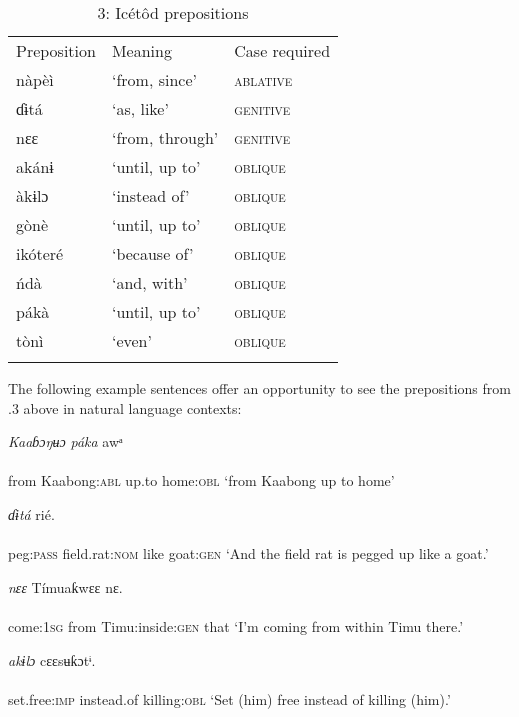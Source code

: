 \begin{table}
\caption{3: Icétôd prepositions}
\label{tab:3}


\begin{tabularx}{\textwidth}{XXX}
\lsptoprule

Preposition & Meaning & Case required\\
nàpèì & ‘from, since’ & \textsc{ablative}\\
ɗɨtá & ‘as, like’ & \textsc{genitive}\\
nɛɛ & ‘from, through’ & \textsc{genitive}\\
akánɨ & ‘until, up to’ & \textsc{oblique}\\
àkɨlɔ & ‘instead of’ & \textsc{oblique}\\
gònè & ‘until, up to’ & \textsc{oblique}\\
ikóteré & ‘because of’ & \textsc{oblique}\\
ńdà & ‘and, with’ & \textsc{oblique}\\
pákà & ‘until, up to’ & \textsc{oblique}\\
tònì & ‘even’ & \textsc{oblique}\\
\lspbottomrule
\end{tabularx}
\end{table}
The following example sentences offer an opportunity to see the prepositions from .3 above in natural language contexts:


 
\ea\label{ex:}
\textit{ Kaaɓɔŋʉɔ}     \textit{páka}   awᵃ  \\
    \\
from   Kaabong:\textsc{abl}   up.to   home:\textsc{obl} 
\glt ‘from Kaabong up to home’ 
\z

\ea\label{ex:}
       \textit{ɗɨtá}   rié. \\
    \\
peg:\textsc{pass}   field.rat:\textsc{nom}   like   goat:\textsc{gen}
\glt ‘And the field rat is pegged up like a goat.’ 
\z





\ea\label{ex:}
     \textit{nɛɛ}   Tímuaƙwɛɛ     nɛ. \\
    \\
come:\textsc{1sg}   from   Timu:inside:\textsc{gen}   that
\glt ‘I’m coming from within Timu there.’ 
\z




\ea\label{ex:}
   \textit{akɨlɔ}     cɛɛsʉƙɔtᶤ. \\
    \\
set.free:\textsc{imp}   instead.of   killing:\textsc{obl}
\glt ‘Set (him) free instead of killing (him).’ 
\z




